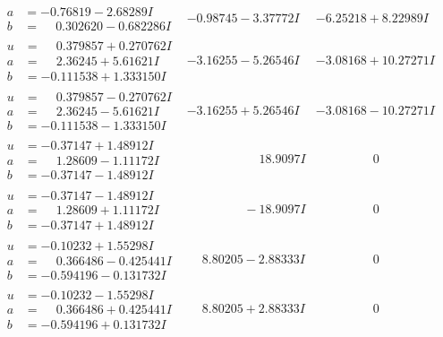 \documentclass[1p]{elsarticle_modified}
\theoremstyle{definition}
\begin{document}
$$\begin{array}{c|c|c}
\begin{aligned}
a &= -0.76819 - 2.68289 I \\
b &= \phantom{-}0.302620 - 0.682286 I\end{aligned}
 & -0.98745 - 3.37772 I & -6.25218 + 8.22989 I \\ \hline\begin{aligned}
u &= \phantom{-}0.379857 + 0.270762 I \\
a &= \phantom{-}2.36245 + 5.61621 I \\
b &= -0.111538 + 1.333150 I\end{aligned}
 & -3.16255 - 5.26546 I & -3.08168 + 10.27271 I \\ \hline\begin{aligned}
u &= \phantom{-}0.379857 - 0.270762 I \\
a &= \phantom{-}2.36245 - 5.61621 I \\
b &= -0.111538 - 1.333150 I\end{aligned}
 & -3.16255 + 5.26546 I & -3.08168 - 10.27271 I \\ \hline\begin{aligned}
u &= -0.37147 + 1.48912 I \\
a &= \phantom{-}1.28609 - 1.11172 I \\
b &= -0.37147 - 1.48912 I\end{aligned}
 & \phantom{-0.000000 -}18.9097 I & \phantom{-0.000000 } 0 \\ \hline\begin{aligned}
u &= -0.37147 - 1.48912 I \\
a &= \phantom{-}1.28609 + 1.11172 I \\
b &= -0.37147 + 1.48912 I\end{aligned}
 & \phantom{-0.000000 } -18.9097 I & \phantom{-0.000000 } 0 \\ \hline\begin{aligned}
u &= -0.10232 + 1.55298 I \\
a &= \phantom{-}0.366486 - 0.425441 I \\
b &= -0.594196 - 0.131732 I\end{aligned}
 & \phantom{-}8.80205 - 2.88333 I & \phantom{-0.000000 } 0 \\ \hline\begin{aligned}
u &= -0.10232 - 1.55298 I \\
a &= \phantom{-}0.366486 + 0.425441 I \\
b &= -0.594196 + 0.131732 I\end{aligned}
 & \phantom{-}8.80205 + 2.88333 I & \phantom{-0.000000 } 0 \\ \hline\begin{aligned}

\end{aligned}
\end{array}$$
\end{document}

